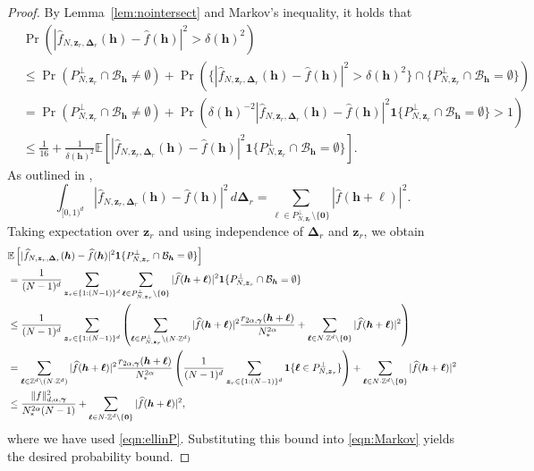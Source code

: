 \documentclass[a4paper,11pt]{article}
\newcommand{\bszero}{\boldsymbol{0}}
\newcommand{\bsh}{\boldsymbol{h}}
\newcommand{\bsl}{\boldsymbol{\ell}}
\newcommand{\bsz}{\boldsymbol{z}}
\newcommand{\bsgamma}{\boldsymbol{\gamma}}
\newcommand{\bsDelta}{\boldsymbol{\Delta}}
\newcommand{\ZZ}{\mathbb{Z}}
\newcommand{\e}{\mathbb{E}}
\newcommand{\bsone}{\boldsymbol{1}}
\begin{document}
\begin{proof}
By Lemma~\ref{lem:nointersect} and Markov's inequality, it holds that
\begin{align}\label{eqn:Markov}
    & \Pr\left(|\widehat{f}_{N,\bsz_r,\bsDelta_r}(\bsh)-\widehat{f}(\bsh)|^2>\delta(\bsh)^2\right)\nonumber\\
    & \le \Pr(P_{N,\boldsymbol{z}_r}^\perp\cap \mathcal{B}_{\bsh}\neq \emptyset)+\Pr\left(\{|\widehat{f}_{N,\bsz_r,\bsDelta_r}(\bsh)-\widehat{f}(\bsh)|^2> \delta(\bsh)^2\}\cap \{P_{N,\boldsymbol{z}_r}^\perp\cap \mathcal{B}_{\bsh}= \emptyset\}\right)\nonumber\\
    & = \Pr(P_{N,\boldsymbol{z}_r}^\perp\cap \mathcal{B}_{\bsh}\neq \emptyset)+\Pr\left(\delta(\bsh)^{-2}|\widehat{f}_{N,\bsz_r,\bsDelta_r}(\bsh)-\widehat{f}(\bsh)|^2\bsone\{P_{N,\boldsymbol{z}_r}^\perp\cap \mathcal{B}_{\bsh}= \emptyset\}> 1\right) \nonumber\\
    & \le \frac{1}{16} 
    +\frac{1}{\delta(\bsh)^2}\e\left[|\widehat{f}_{N,\bsz_r,\bsDelta_r}(\bsh)-\widehat{f}(\bsh)|^2\bsone\{P_{N,\boldsymbol{z}_r}^\perp\cap \mathcal{B}_{\bsh}= \emptyset\}\right].
\end{align}
As outlined in \cite[Proof of Lemma 4.1]{CGK24},
\begin{equation}\label{eqn:deltamean}
\int_{[0,1)^d} |\widehat{f}_{N,\bsz_r,\bsDelta_r}(\bsh)-\widehat{f}(\bsh)|^2 \, d\bsDelta_r
= \sum_{\bsl \in P_{N,\bsz_r}^\perp \setminus \{\bszero\}} |\widehat{f}(\bsh+\bsl)|^2.
\end{equation}
Taking expectation over $\bsz_r$ and using independence of $\bsDelta_r$ and $\bsz_r$, we obtain
\begin{align*}
    & \e\left[|\widehat{f}_{N,\bsz_r,\bsDelta_r}(\bsh)-\widehat{f}(\bsh)|^2\bsone\{P_{N,\boldsymbol{z}_r}^\perp\cap \mathcal{B}_{\bsh}= \emptyset\}\right] \notag \\
    & = \frac{1}{(N-1)^d}\sum_{\bsz_r\in \{1{:}(N-1)\}^d}\sum_{\bsl \in P_{N,\boldsymbol{z}_r}^\perp\setminus \{\bszero\}}|\widehat{f}(\bsh+\bsl)|^2 \bsone\{P_{N,\boldsymbol{z}_r}^\perp\cap \mathcal{B}_{\bsh}= \emptyset\}\notag\\
    & \le \frac{1}{(N-1)^d}\sum_{\bsz_r\in \{1{:}(N-1)\}^d}\left(\sum_{\bsl \in P_{N,\boldsymbol{z}_r}^\perp\setminus (N\cdot \ZZ^d) }|\widehat{f}(\bsh+\bsl)|^2 \frac{r_{2\alpha, \bsgamma}(\bsh+\bsl) }{N_*^{2\alpha}}+\sum_{\bsl \in N\cdot \ZZ^d\setminus \{\bszero\} }|\widehat{f}(\bsh+\bsl)|^2\right) \notag\\
    & = \sum_{\bsl \in \ZZ^d\setminus (N\cdot \ZZ^d)}|\widehat{f}(\bsh+\bsl)|^2\frac{r_{2\alpha, \bsgamma}(\bsh+\bsl) }{N_*^{2\alpha}}\left(\frac{1}{(N-1)^d}\sum_{\bsz_r\in \{1{:}(N-1)\}^d}\bsone\{\bsl \in P_{N,\boldsymbol{z}_r}^\perp\}\right)+\sum_{\bsl \in N\cdot \ZZ^d\setminus \{\bszero\} }|\widehat{f}(\bsh+\bsl)|^2\notag\\
    & \le \frac{\|f\|^2_{d,\alpha,\bsgamma}}{N_*^{2\alpha}(N-1) }+\sum_{\bsl \in N\cdot \ZZ^d\setminus \{\bszero\} }|\widehat{f}(\bsh+\bsl)|^2,
\end{align*}
where we have used \eqref{eqn:ellinP}. Substituting this bound into \eqref{eqn:Markov} yields the desired probability bound.
\end{proof}
\end{document}
